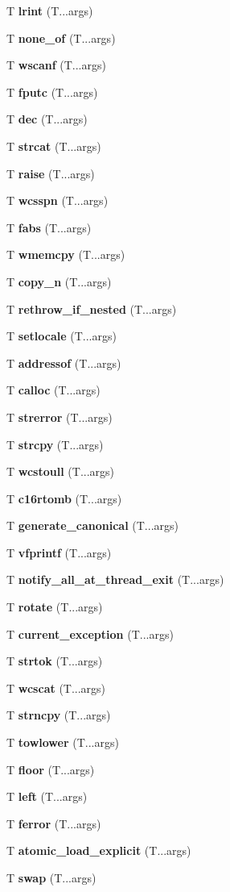 \begin{DoxyCompactItemize}
T {\bf lrint} (T...\+args)
\item 
T {\bf none\+\_\+of} (T...\+args)
\item 
T {\bf wscanf} (T...\+args)
\item 
T {\bf fputc} (T...\+args)
\item 
T {\bf dec} (T...\+args)
\item 
T {\bf strcat} (T...\+args)
\item 
T {\bf raise} (T...\+args)
\item 
T {\bf wcsspn} (T...\+args)
\item 
T {\bf fabs} (T...\+args)
\item 
T {\bf wmemcpy} (T...\+args)
\item 
T {\bf copy\+\_\+n} (T...\+args)
\item 
T {\bf rethrow\+\_\+if\+\_\+nested} (T...\+args)
\item 
T {\bf setlocale} (T...\+args)
\item 
T {\bf addressof} (T...\+args)
\item 
T {\bf calloc} (T...\+args)
\item 
T {\bf strerror} (T...\+args)
\item 
T {\bf strcpy} (T...\+args)
\item 
T {\bf wcstoull} (T...\+args)
\item 
T {\bf c16rtomb} (T...\+args)
\item 
T {\bf generate\+\_\+canonical} (T...\+args)
\item 
T {\bf vfprintf} (T...\+args)
\item 
T {\bf notify\+\_\+all\+\_\+at\+\_\+thread\+\_\+exit} (T...\+args)
\item 
T {\bf rotate} (T...\+args)
\item 
T {\bf current\+\_\+exception} (T...\+args)
\item 
T {\bf strtok} (T...\+args)
\item 
T {\bf wcscat} (T...\+args)
\item 
T {\bf strncpy} (T...\+args)
\item 
T {\bf towlower} (T...\+args)
\item 
T {\bf floor} (T...\+args)
\item 
T {\bf left} (T...\+args)
\item 
T {\bf ferror} (T...\+args)
\item 
T {\bf atomic\+\_\+load\+\_\+explicit} (T...\+args)
\item 
T {\bf swap} (T...\+args)
\item 

\end{DoxyCompactItemize}

